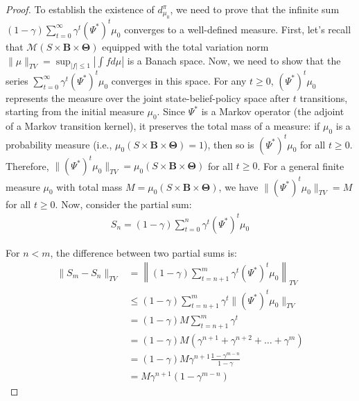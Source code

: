 \documentclass[a4paper,12pt]{report}
\begin{document}
\begin{proof}
    To establish the existence of $d^{\pi}_{\mu_0}$, we need to prove that the
    infinite sum $(1-\gamma) \sum_{t=0}^{\infty}\gamma^{t} (\Psi^{*})^{t} \mu_{0}$
    converges to a well-defined measure. First, let's recall that
    $\mathcal{M}(S \times \boldsymbol{B}\times \boldsymbol{\Theta})$ equipped with
    the total variation norm
    $\|\mu\|_{TV}= \sup_{|f| \leq 1}\left|\int f d\mu\right|$ is a Banach space. Now,
    we need to show that the series
    $\sum_{t=0}^{\infty}\gamma^{t} (\Psi^{*})^{t} \mu_{0}$ converges in this space.
    For any $t \geq 0$, $(\Psi^{*})^{t} \mu_{0}$ represents the measure over the
    joint state-belief-policy space after $t$ transitions, starting from the initial
    measure $\mu_{0}$. Since $\Psi^{*}$ is a Markov operator (the adjoint of a Markov
    transition kernel), it preserves the total mass of a measure: if $\mu_{0}$ is
    a probability measure (i.e., $\mu_{0}(S \times \boldsymbol{B}\times \boldsymbol
        {\Theta}) = 1$), then so is $(\Psi^{*})^{t} \mu_{0}$ for all $t \geq 0$.
    Therefore, $\|(\Psi^{*})^{t} \mu_{0}\|_{TV}= \mu_{0}(S \times \boldsymbol{B}\times
        \boldsymbol{\Theta})$ for all $t \geq 0$. For a general finite measure
    $\mu_{0}$ with total mass
    $M = \mu_{0}(S \times \boldsymbol{B}\times \boldsymbol{\Theta})$, we have $\|(\Psi
        ^{*})^{t} \mu_{0}\|_{TV}= M$ for all $t \geq 0$. Now, consider the partial sum:
    \begin{align}
        S_{n} = (1-\gamma) \sum_{t=0}^{n}\gamma^{t} (\Psi^{*})^{t} \mu_{0}
    \end{align}

    For $n < m$, the difference between two partial sums is:
    \begin{align}
        \|S_{m} - S_{n}\|_{TV} & = \left\| (1-\gamma) \sum_{t=n+1}^{m}\gamma^{t} (\Psi^{*})^{t} \mu_{0} \right\|_{TV} \\
                               & \leq (1-\gamma) \sum_{t=n+1}^{m}\gamma^{t} \|(\Psi^{*})^{t} \mu_{0}\|_{TV}           \\
                               & = (1-\gamma) M \sum_{t=n+1}^{m}\gamma^{t}                                            \\
                               & = (1-\gamma) M (\gamma^{n+1}+ \gamma^{n+2}+ \ldots + \gamma^{m})                     \\
                               & = (1-\gamma) M \gamma^{n+1}\frac{1 - \gamma^{m-n}}{1 - \gamma}                       \\
                               & = M \gamma^{n+1}(1 - \gamma^{m-n})
    \end{align}


\end{proof}
\end{document}
